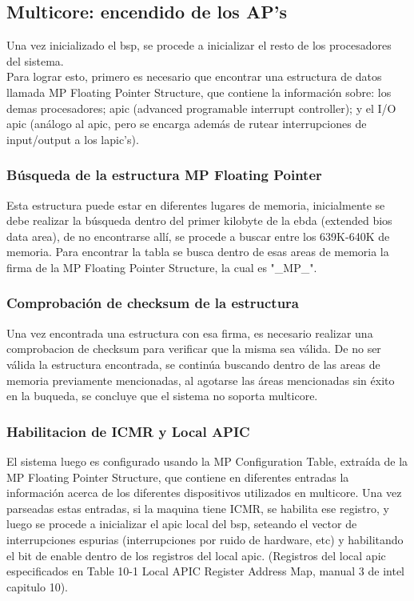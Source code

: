 \subsection{Multicore: encendido de los AP's}

Una vez inicializado el bsp, se procede a inicializar el resto de los procesadores del sistema.\\
Para lograr esto, primero es necesario que encontrar una estructura de datos llamada MP Floating Pointer Structure, que contiene la información sobre: los demas procesadores; apic (advanced programable interrupt controller); y el I/O apic (análogo al apic, pero se encarga además de rutear interrupciones de input/output a los lapic's).

\subsubsection{Búsqueda de la estructura MP Floating Pointer}
Esta estructura puede estar en diferentes lugares de memoria, inicialmente se debe realizar la búsqueda dentro del primer kilobyte de la ebda (extended bios data area), de no encontrarse allí, se procede a buscar entre los 639K-640K de memoria.
Para encontrar la tabla se busca dentro de esas areas de memoria la firma de la MP Floating Pointer Structure, la cual es "\_MP\_".

\subsubsection{Comprobación de checksum de la estructura}
Una vez encontrada una estructura con esa firma, es necesario realizar una comprobacion de checksum para verificar que la misma sea válida.
De no ser válida la estructura encontrada, se continúa buscando dentro de las areas de memoria previamente mencionadas, al agotarse las áreas mencionadas sin éxito en la buqueda, se concluye que el sistema no soporta multicore.

\subsubsection{Habilitacion de ICMR y Local APIC}
El sistema luego es configurado usando la MP Configuration Table, extraída de la MP Floating Pointer Structure, que contiene en diferentes entradas la información acerca de los diferentes dispositivos utilizados en multicore.
Una vez parseadas estas entradas, si la maquina tiene ICMR, se habilita ese registro, y luego se procede a inicializar el apic local del bsp, seteando el vector de interrupciones espurias (interrupciones por ruido de hardware, etc) y habilitando el bit de enable dentro de los registros del local apic. (Registros del local apic especificados en Table 10-1 Local APIC Register Address Map, manual 3 de intel capitulo 10).

